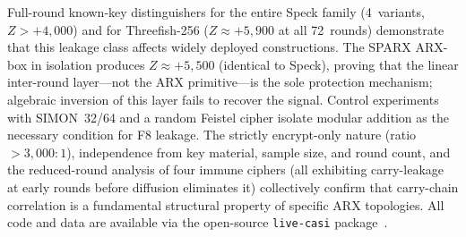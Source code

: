 \documentclass[conference,a4paper]{IEEEtran}
\begin{document}
Full-round known-key distinguishers for the entire Speck family (4~variants, $Z > +4{,}000$) and for Threefish-256 ($Z \approx +5{,}900$ at all 72~rounds) demonstrate that this leakage class affects widely deployed constructions. The SPARX ARX-box in isolation produces $Z \approx +5{,}500$ (identical to Speck), proving that the linear inter-round layer---not the ARX primitive---is the sole protection mechanism; algebraic inversion of this layer fails to recover the signal. Control experiments with SIMON~32/64 and a random Feistel cipher isolate modular addition as the necessary condition for F8 leakage. The strictly encrypt-only nature (ratio $> 3{,}000{:}1$), independence from key material, sample size, and round count, and the reduced-round analysis of four immune ciphers (all exhibiting carry-leakage at early rounds before diffusion eliminates it) collectively confirm that carry-chain correlation is a fundamental structural property of specific ARX topologies. All code and data are available via the open-source \texttt{live-casi} package~\cite{livecasi}.
\end{document}
